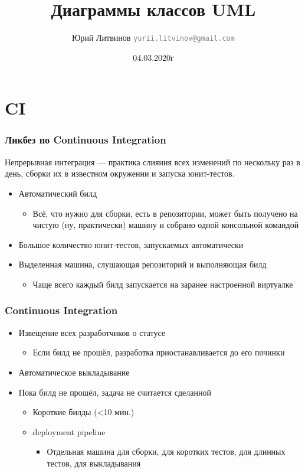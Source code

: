 \documentclass[xetex,mathserif,serif]{beamer}
\title{Диаграммы классов UML}
\author[Юрий Литвинов]{Юрий Литвинов \newline \textcolor{gray}{\small\texttt{yurii.litvinov@gmail.com}}}
\date{04.03.2020г}
\begin{document}
	
	\frame{\titlepage}

	\section{CI}

	\begin{frame}
		\frametitle{Ликбез по Continuous Integration}
		Непрерывная интеграция --- практика слияния всех изменений по нескольку раз в день, сборки их в известном окружении и запуска юнит-тестов.
		\begin{itemize}
			\item Автоматический билд
			\begin{itemize}
				\item Всё, что нужно для сборки, есть в репозитории, может быть получено на чистую (ну, практически) машину и собрано одной консольной командой
			\end{itemize}
			\item Большое количество юнит-тестов, запускаемых автоматически
			\item Выделенная машина, слушающая репозиторий и выполняющая билд
			\begin{itemize}
				\item Чаще всего каждый билд запускается на заранее настроенной виртуалке
			\end{itemize}
		\end{itemize}
	\end{frame}

	\begin{frame}
		\frametitle{Continuous Integration}
		\begin{itemize}
			\item Извещение всех разработчиков о статусе
			\begin{itemize}
				\item Если билд не прошёл, разработка приостанавливается до его починки
			\end{itemize}
			\item Автоматическое выкладывание
			\item Пока билд не прошёл, задача не считается сделанной
			\begin{itemize}
				\item Короткие билды (<10 мин.)
				\item deployment pipeline
				\begin{itemize}
					\item Отдельная машина для сборки, для коротких тестов, для длинных тестов, для выкладывания
				\end{itemize}
			\end{itemize}
		\end{itemize}
	\end{frame}
\end{document}
